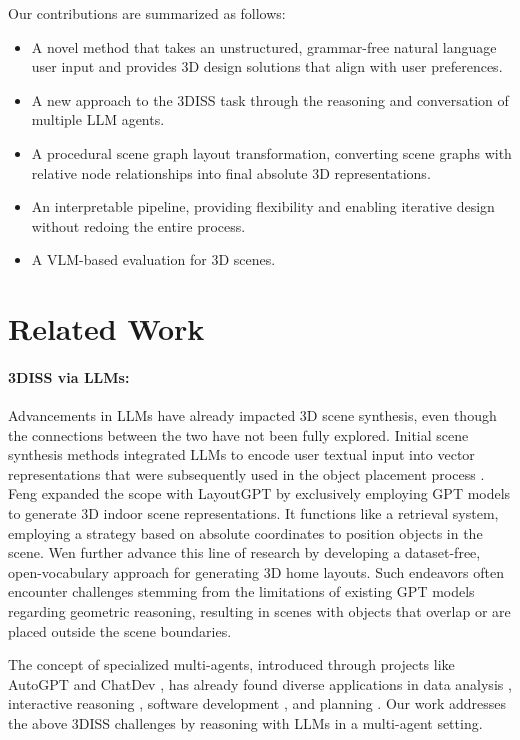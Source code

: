 \documentclass[runningheads]{llncs}
\begin{document}
Our contributions are summarized as follows:
\begin{itemize}
    \item A novel method that takes an unstructured, grammar-free natural language user input and provides 3D design solutions that align with user preferences.
    \item A new approach to the 3DISS task through the reasoning and conversation of multiple LLM agents.  
    \item A procedural scene graph layout transformation, converting scene graphs with relative node relationships into final absolute 3D representations. 
    \item An interpretable pipeline, providing flexibility and enabling iterative design without redoing the entire process. 
    \item A VLM-based evaluation for 3D scenes.
\end{itemize}

\section{Related Work}

\paragraph{\textbf{3DISS via LLMs}:}
Advancements in LLMs have already impacted 3D scene synthesis, even though the connections between the two have not been fully explored.
Initial scene synthesis methods integrated LLMs to encode user textual input into vector representations that were subsequently used in the object placement process \cite{tang2023diffuscene, wang2021sceneformer, lin2024instructscene, liu2023cliplayout}. 
Feng \etal \cite{feng2023layoutgpt} expanded the scope with LayoutGPT by exclusively employing GPT models to generate 3D indoor scene representations. It functions like a retrieval system, employing a strategy based on absolute coordinates to position objects in the scene. Wen \etal \cite{wen2023anyhome} further advance this line of research by developing a dataset-free, open-vocabulary approach for generating 3D home layouts. 
Such endeavors often encounter challenges stemming from the limitations of existing GPT models regarding geometric reasoning, resulting in scenes with objects that overlap or are placed outside the scene boundaries. 

The concept of specialized multi-agents, introduced through projects like AutoGPT \cite{yang2023auto} and ChatDev \cite{qian2023communicative}, has already found diverse applications in data analysis \cite{jin2023genegpt},  interactive reasoning \cite{lin2023swiftsage, wang2023jarvis}, software development \cite{qian2023communicative}, and planning \cite{song2023llm, chen2023autoagents, shen2023hugginggpt}. Our work addresses the above 3DISS challenges by reasoning with LLMs in a multi-agent setting.
\end{document}

